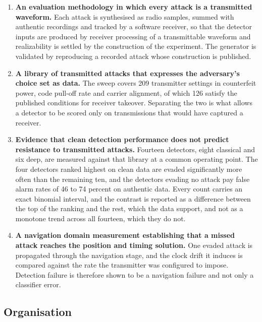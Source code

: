 \documentclass[pdflatex,sn-basic]{sn-jnl}
\theoremstyle{thmstyleone}
\theoremstyle{thmstyletwo}
\theoremstyle{thmstylethree}
\begin{document}
\begin{enumerate}
  \item \textbf{An evaluation methodology in which every attack is a transmitted
  waveform.} Each attack is synthesised as radio samples, summed with authentic recordings
  and tracked by a software receiver, so that the detector inputs are produced by receiver
  processing of a transmittable waveform and realizability is settled by the construction
  of the experiment. The generator is validated by reproducing a recorded attack whose
  construction is published.

  \item \textbf{A library of transmitted attacks that expresses the adversary's choice
  set as data.} The sweep covers 209 transmitter settings in counterfeit power, code
  pull-off rate and carrier alignment, of which 126 satisfy the published conditions for
  receiver takeover. Separating the two is what allows a detector to be scored only on
  transmissions that would have captured a receiver.

  \item \textbf{Evidence that clean detection performance does not predict resistance
  to transmitted attacks.} Fourteen detectors, eight classical and six deep, are measured
  against that library at a common operating point. The four detectors ranked highest on
  clean data are evaded significantly more often than the remaining ten, and the detectors
  evading no attack pay false alarm rates of 46 to 74 percent on authentic data. Every
  count carries an exact binomial interval, and the contrast is reported as a difference
  between the top of the ranking and the rest, which the data support, and not as a
  monotone trend across all fourteen, which they do not.

  \item \textbf{A navigation domain measurement establishing that a missed attack
  reaches the position and timing solution.} One evaded attack is propagated through the
  navigation stage, and the clock drift it induces is compared against the rate the
  transmitter was configured to impose. Detection failure is therefore shown to be a
  navigation failure and not only a classifier error.
\end{enumerate}

\subsection{Organisation}
\end{document}
